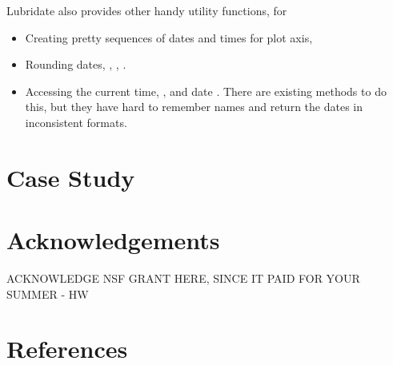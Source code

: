 \documentclass[article]{jss}
\begin{document}
Lubridate also provides other handy utility functions, for

\begin{itemize}
  \item Creating pretty sequences of dates and times for plot axis, 
  
  \item Rounding dates, , , .

  \item Accessing the current time, , and date .  There are existing methods to do this, but they have hard to remember names and return the dates in inconsistent formats.
  
\end{itemize}

\section{Case Study}

\section*{Acknowledgements}

ACKNOWLEDGE NSF GRANT HERE, SINCE IT PAID FOR YOUR SUMMER - HW

\section*{References}
\end{document}
